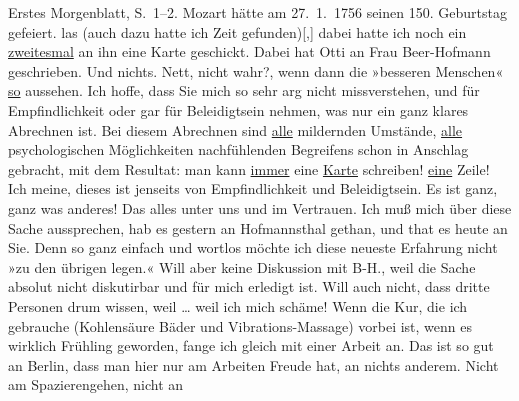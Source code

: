 \begin{ledgroupsized}[t]{13cm}
{{{                     Erstes Morgenblatt, S. 1–2. Mozart hätte am 27. 1. 1756 seinen 150. Geburtstag
                  gefeiert.}}}\label{K_L03415-88h} las (auch dazu hatte ich Zeit gefunden){[},{]}
               dabei hatte ich noch ein \uline{zweitesmal} an ihn eine Karte
               geschickt. Dabei hat Otti an Frau Beer-Hofmann geschrieben. Und nichts. Nett, nicht wahr?,
               wenn dann die »besseren Menschen« \uline{so} aussehen. Ich
               hoffe, dass Sie mich so sehr arg nicht missverstehen, und für Empfindlichkeit oder
               gar für Beleidigtsein nehmen, was nur ein ganz klares Abrechnen ist. Bei diesem
               Abrechnen sind \uline{alle} mildernden Umstände, \uline{alle} psychologischen Möglichkeiten nachfühlenden
               Begreifens schon in Anschlag gebracht, mit dem Resultat: man kann \uline{immer} eine \uline{Karte}
               schreiben! \uline{eine} Zeile! Ich meine, dieses ist jenseits
               von Empfindlichkeit und Beleidigtsein. Es ist ganz, ganz was anderes! Das alles unter
               uns und im Vertrauen. Ich muß mich über diese Sache aussprechen, hab es gestern an
                  Hofmannsthal gethan, und that es heute an
               Sie. Denn so ganz einfach und wortlos möchte ich diese neueste Erfahrung nicht »zu
               den übrigen legen.« Will aber keine Diskussion mit B-H., weil die Sache absolut nicht diskutirbar und für mich erledigt ist.
               Will auch nicht, dass dritte Personen drum wissen, weil {\dots}
               weil ich mich schäme! \pend
           \pstart
           Wenn die Kur, die ich gebrauche (Kohlensäure Bäder und Vibrations-Massage) vorbei
               ist, wenn es wirklich Frühling geworden, fange ich gleich mit einer Arbeit an. Das
               ist so gut an Berlin, dass man hier nur am
               Arbeiten Freude hat, an nichts anderem. Nicht am Spazierengehen, nicht an

\end{ledgroupsized}
